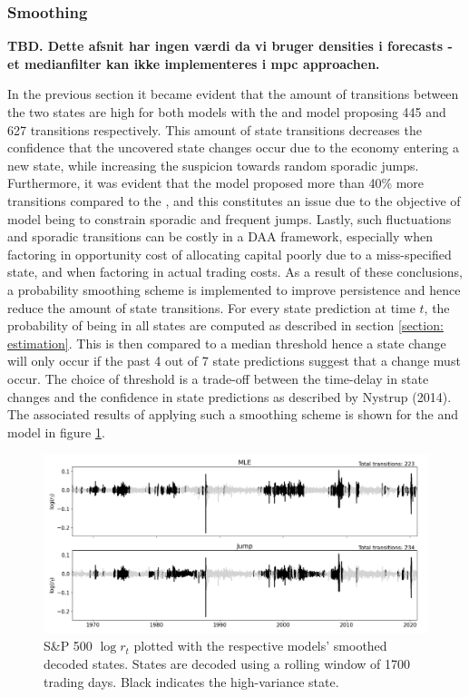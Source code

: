 \subsubsection{Smoothing}

\textbf{TBD. Dette afsnit har ingen værdi da vi bruger densities i forecasts - et medianfilter kan ikke implementeres i mpc approachen.}

In the previous section it became evident that the amount of transitions between the two states are high for both models with the \mle and \jump model proposing 445 and 627 transitions respectively. This amount of state transitions decreases the confidence that the uncovered state changes occur due to the economy entering a new state, while increasing the suspicion towards random sporadic jumps. Furthermore, it was evident that the \jump model proposed more than 40\% more transitions compared to the \mle, and this constitutes an issue due to the objective of \jump model being to constrain sporadic and frequent jumps. Lastly, such fluctuations and sporadic transitions can be costly in a DAA framework, especially when factoring in opportunity cost of allocating capital poorly due to a miss-specified state, and when factoring in actual trading costs. As a result of these conclusions, a probability smoothing scheme is implemented to improve persistence and hence reduce the amount of state transitions. For every state prediction at time $t$, the probability of being in all states are computed as described in section \ref{section: estimation}. This is then compared to a median threshold hence a state change will only occur if the past 4 out of 7 state predictions suggest that a change must occur. The choice of threshold is a trade-off between the time-delay in state changes and the confidence in state predictions as described by Nystrup (2014). The associated results of applying such a smoothing scheme is shown for the \mle and \jump model in figure \ref{fig:stylized_facts_decoded_states_filtered}.

\begin{figure}[H] 
    \centering
    \includegraphics[width=1.0\textwidth]{analysis/stylized_facts/images/decoded_states_filter.png}
    \caption[S\&P 500 $\log r_t$ plotted with the respective models' smoothed decoded states]{S\&P 500 $\log r_t$ plotted with the respective models' smoothed decoded states. States are decoded using a rolling window of 1700 trading days.  Black indicates the high-variance state.}
    \label{fig:stylized_facts_decoded_states_filtered} 
\end{figure}


